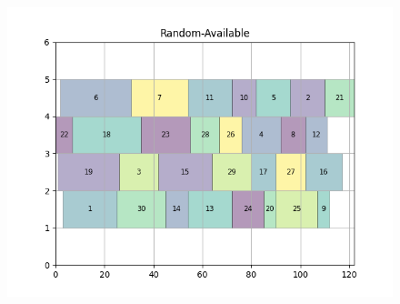 \documentclass[a4paper]{article}
\begin{document}
\begin{figure}[ht]
  \begin{minipage}[b]{0.5\linewidth}
    \centering
    \includegraphics[width=1.11\linewidth]{MBSS/plot/Gantt_charts/Random-Available.png} 
    \caption{} 
    \vspace{4ex}
  \end{minipage}%
\end{figure}

\end{document}

